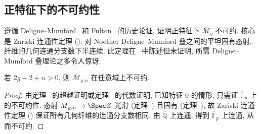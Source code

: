 \subsection{正特征下的不可约性}\label{src:6.7.5-subsection}
遵循 Deligne--Mumford~\cite{DM69} 和 Fulton~\cite{Ful69} 的历史论证, 证明正特征下 $\overline{\mathcal M}_g$ 不可约. 核心是 Zariski 连通性定理 (): 对 Noether Deligne--Mumford 叠之间的平坦固有态射, 纤维的几何连通分支数下半连续. 此定理在~\cite[定理 4.17]{DM69} 中陈述但未证明, 所需 Deligne--Mumford 叠理论之多令人惊讶.
\begin{theorem}\label{src:6.7.33}
若 $2g-2+n>0$, 则 $\overline{\mathcal M}_{g,\allowbreak n}$ 在任意域上不可约.
\end{theorem}
\begin{proof}
由定理~ 的超越证明或定理~ 的代数证明, 已知特征 $0$ 的情形, 只需证 $\overline{\mathbb F}_p$ 上的不可约性. 态射 $\overline{\mathcal M}_{g,\allowbreak n}\to\Spec\mathbb Z$ 光滑 (定理~) 且固有 (定理~), 故 Zariski 连通性定理 () 保证所有几何纤维的连通分支数相同. 由 $\overline{\mathbb Q}$ 上连通, 得到 $\overline{\mathbb F}_p$ 上连通, 从而不可约.
\end{proof}
